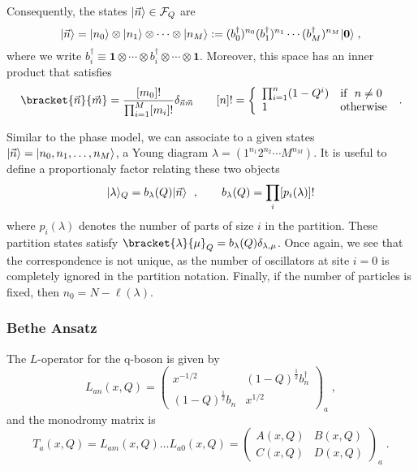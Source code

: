 \documentclass[a4paper,11pt]{amsart}
\begin{document}
Consequently, the states \(\lvert\vec{n}\rangle \in \mathcal{F}_Q\) are
\begin{equation}
  \lvert\vec{n}\rangle = \lvert n_0\rangle\otimes \lvert n_1\rangle \otimes \cdots \otimes \lvert n_M\rangle 
 : =  (b_0^\dagger)^{n_0} (b_1^\dagger)^{n_1} \cdots  (b_M^\dagger)^{n_M} \lvert\bm{0}\rangle \; ,
\end{equation}
where we write \(b_i^\dagger \equiv \bm{1} \otimes  \cdots \otimes
b_i^\dagger \otimes \cdots \otimes \bm{1}\).
Moreover, this space has an inner product that satisfies
\begin{equation}
  \bracket{\vec{n}}{\vec{m}} = \frac{[m_0]!}{\prod_{i=1}^M[m_i]!} \delta_{\vec{n}\vec{m}}\qquad 
    [n]! =
    \left\{
    \begin{array}{ll}
    \prod_{i=1}^n(1 - Q^i) & \textrm{if}\ \ n\neq 0 \\
    1 & \textrm{otherwise}
  \end{array}\right.\; .
\end{equation}

Similar to the phase model, we can associate to a given states
\(\lvert\vec{n}\rangle = \lvert n_0, n_1, \dots, n_M\rangle\), a Young diagram
\(\lambda = (1^{n_1} 2^{n_2} \cdots M^{n_M})\). It is useful to define
a proportionaly factor relating these two objects
\begin{equation}
  \lvert\lambda\rangle_Q  = b_\lambda(Q) \lvert\vec{n}\rangle  \ \; , \qquad b_\lambda(Q) = \prod_i [p_i(\lambda)]! 
\end{equation}
where \(p_i(\lambda)\) denotes the number of parts of size \(i\) in
the partition. These partition states satisfy
\(\bracket{\lambda}{\mu}_Q = b_\lambda(Q) \delta_{\lambda,\mu}\). Once
again, we see that the correspondence is not unique, as the number of
oscillators at site \(i=0\) is completely ignored in the partition
notation. Finally, if the number of particles is fixed, then \(n_0 = N
- \ell(\lambda)\).


\subsubsection{Bethe Ansatz}
The \(L\)-operator for the q-boson is given by
\begin{equation}
  L_{an}(x, Q) =
  \begin{pmatrix}
    x^{-1/2} & (1 - Q)^{\frac{1}{2}} b_n^\dagger \\ (1 - Q)^{\frac{1}{2}} b_n & x^{1/2}
  \end{pmatrix}_a\; ,
\end{equation}
and the monodromy matrix is 
\begin{equation}
  T_a(x,Q) = L_{am}(x, Q)  \dots  L_{a0}(x, Q) = 
  \begin{pmatrix}
    A(x, Q) & B(x, Q) \\ C(x, Q) & D(x, Q)
  \end{pmatrix}_a\; .
\end{equation}
\end{document}
